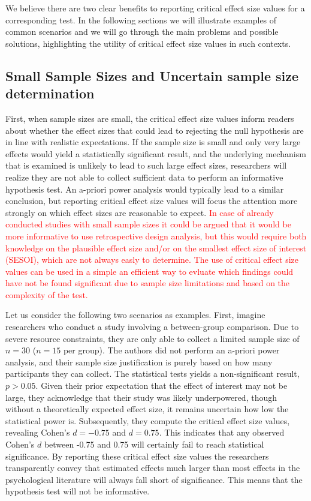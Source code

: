 \documentclass[
  man]{apa7}
\begin{document}
We believe there are two clear benefits to reporting critical effect size values for a corresponding test. In the following sections we will illustrate examples of common scenarios and we will go through the main problems and possible solutions, highlighting the utility of critical effect size values in such contexts.

\hypertarget{small-sample-sizes-and-uncertain-sample-size-determination}{%
\subsection{Small Sample Sizes and Uncertain sample size determination}\label{small-sample-sizes-and-uncertain-sample-size-determination}}

First, when sample sizes are small, the critical effect size values inform readers about whether the effect sizes that could lead to rejecting the null hypothesis are in line with realistic expectations. If the sample size is small and only very large effects would yield a statistically significant result, and the underlying mechanism that is examined is unlikely to lead to such large effect sizes, researchers will realize they are not able to collect sufficient data to perform an informative hypothesis test. An a-priori power analysis would typically lead to a similar conclusion, but reporting critical effect size values will focus the attention more strongly on which effect sizes are reasonable to expect. \textcolor{red}{In case of already conducted studies with small sample sizes it could be argued that it would be more informative to use retrospective design analysis, but this would require both knowledge on the plausible effect size and/or on the smallest effect size of interest (SESOI), which are not always easly to determine. The use of critical effect size values can be used in a simple an efficient way to evluate which findings could have not be found significant due to sample size limitations and based on the complexity of the test.}

Let us consider the following two scenarios as examples. First, imagine researchers who conduct a study involving a between-group comparison. Due to severe resource constraints, they are only able to collect a limited sample size of \(n = 30\) (\(n = 15\) per group). The authors did not perform an a-priori power analysis, and their sample size justification is purely based on how many participants they can collect. The statistical tests yields a non-significant result, \(p > 0.05\). Given their prior expectation that the effect of interest may not be large, they acknowledge that their study was likely underpowered, though without a theoretically expected effect size, it remains uncertain how low the statistical power is. Subsequently, they compute the critical effect size values, revealing Cohen's \(d = -0.75\) and \(d = 0.75\). This indicates that any observed Cohen's \(d\) between -0.75 and 0.75 will certainly fail to reach statistical significance. By reporting these critical effect size values the researchers transparently convey that estimated effects much larger than most effects in the psychological literature will always fall short of significance. This means that the hypothesis test will not be informative.
\end{document}
